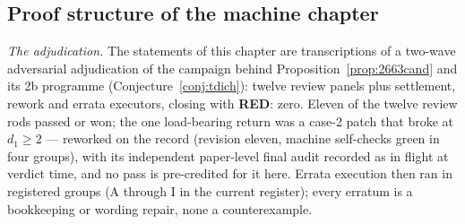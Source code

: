 \subsection{Proof structure of the machine chapter}\label{subsec:machproof}

\emph{The adjudication.} The statements of this chapter are transcriptions of
a two-wave adversarial adjudication of the campaign behind
Proposition~\ref{prop:2663cand} and its 2b programme
(Conjecture~\ref{conj:tdich}): twelve review panels plus settlement, rework
and errata executors, closing with \textbf{RED}: zero. Eleven of the twelve
review rods passed or won; the one load-bearing return was a case-2 patch
that broke at $d_1\ge2$ --- reworked on the record (revision eleven, machine
self-checks green in four groups), with its independent paper-level final
audit recorded as in flight at verdict time, and no pass is pre-credited for
it here. Errata execution then ran in registered groups (A through I in the
current register); every erratum is a bookkeeping or wording repair, none a
counterexample.

